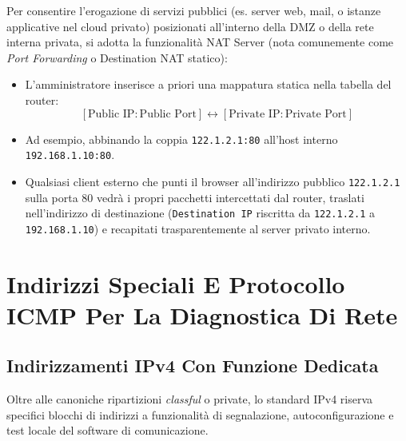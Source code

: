 \documentclass[11pt, a4paper]{article}
\begin{document}
Per consentire l'erogazione di servizi pubblici (es. server web, mail, o istanze applicative nel cloud privato) posizionati all'interno della DMZ o della rete interna privata, si adotta la funzionalità NAT Server (nota comunemente come \emph{Port Forwarding} o Destination NAT statico):
\begin{itemize}
    \item L'amministratore inserisce a priori una mappatura statica nella tabella del router:
    \[
    [\text{Public IP}:\text{Public Port}] \longleftrightarrow [\text{Private IP}:\text{Private Port}]
    \]
    \item Ad esempio, abbinando la coppia \texttt{122.1.2.1:80} all'host interno \texttt{192.168.1.10:80}.
    \item Qualsiasi client esterno che punti il browser all'indirizzo pubblico \texttt{122.1.2.1} sulla porta 80 vedrà i propri pacchetti intercettati dal router, traslati nell'indirizzo di destinazione (\texttt{Destination IP} riscritta da \texttt{122.1.2.1} a \texttt{192.168.1.10}) e recapitati trasparentemente al server privato interno.
\end{itemize}

\newpage
\section{Indirizzi Speciali E Protocollo ICMP Per La Diagnostica Di Rete}

\subsection{Indirizzamenti IPv4 Con Funzione Dedicata}
Oltre alle canoniche ripartizioni \emph{classful} o private, lo standard IPv4 riserva specifici blocchi di indirizzi a funzionalità di segnalazione, autoconfigurazione e test locale del software di comunicazione.

\end{document}
